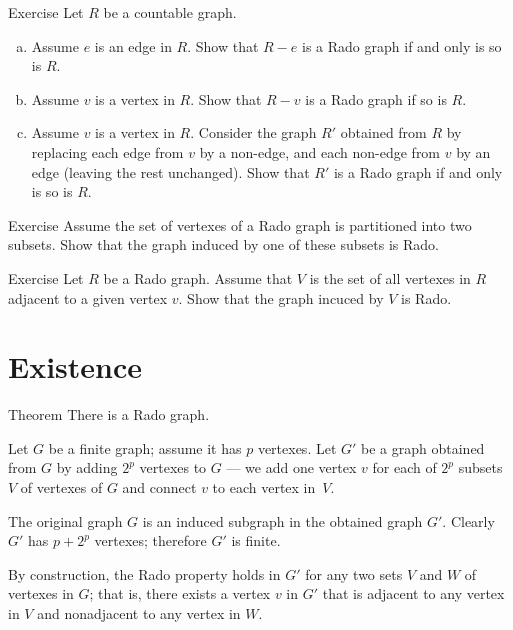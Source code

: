 \begin{thm}{Exercise}
Let $R$ be a countable graph. 
\begin{enumerate}[(a)]
 \item Assume  $e$ is an edge in $R$. 
 Show that $R-e$ is a Rado graph if and only is so is $R$.
 
 \item Assume $v$ is a vertex in $R$. 
 Show that $R-v$ is a Rado graph if so is $R$.
 
 \item Assume $v$ is a vertex in $R$. 
 Consider the graph $R'$ obtained from $R$ by replacing each edge from $v$ by a non-edge, and each non-edge from $v$ by an edge (leaving the rest unchanged).
 Show that $R'$ is a Rado graph if and only is so is $R$. 
\end{enumerate}

\end{thm}

\begin{thm}{Exercise}
Assume the set of vertexes of a Rado graph is partitioned into two subsets.
Show that the graph induced by one of these subsets is Rado.
\end{thm}

\begin{thm}{Exercise}
Let $R$ be a Rado graph.
Assume that $V$ is the set of all vertexes in $R$ adjacent to a given vertex $v$.
Show that the graph incuced by $V$ is Rado.
\end{thm}


\section*{Existence}

\begin{thm}{Theorem}
There is a Rado graph.
\end{thm}

Let $G$ be a finite graph; assume it has $p$ vertexes.
Let $G'$ be a graph obtained from $G$ by adding $2^p$ vertexes to $G$ --- we add one vertex $v$ for each of $2^p$ subsets $V$ of vertexes of $G$ and connect $v$ to each vertex in~$V$.

The original graph $G$ is an induced subgraph in the obtained graph $G'$.
Clearly $G'$ has $p+2^p$ vertexes; therefore $G'$ is finite.

By construction, the Rado property holds in $G'$ for any two sets $V$ and $W$ of vertexes in $G$; that is, there exists a
vertex $v$ in $G'$ that is adjacent to any vertex in $V$ and nonadjacent to any vertex in $W$.

